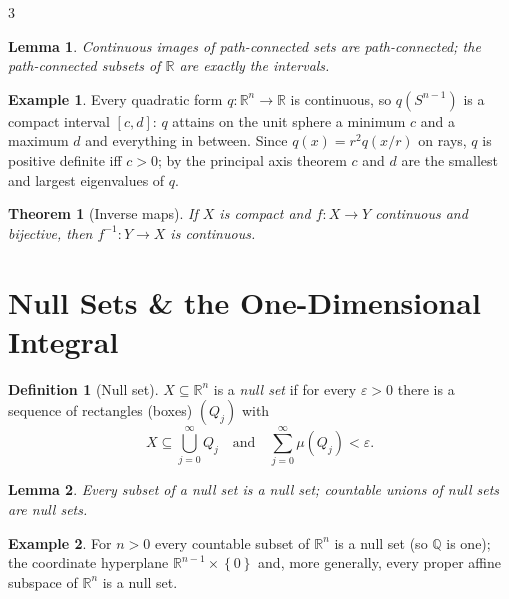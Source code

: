 \documentclass[10pt,a4paper,landscape]{article}
\theoremstyle{definition}
\newtheorem{defn}{Definition}[section]
\newtheorem{exm}{Example}[section]
\theoremstyle{plain}
\newtheorem{thm}{Theorem}[section]
\newtheorem{lem}{Lemma}[section]
\theoremstyle{remark}
\newcommand{\R}{\mathbb{R}}
\newcommand{\Q}{\mathbb{Q}}
\newcommand{\eps}{\varepsilon}
\newcommand{\set}[1]{\left\{ #1 \right\}}
\newcommand{\oo}{\infty}
\begin{document}
\begin{multicols*}{3}
\begin{lem}
Continuous images of path-connected sets are path-connected; the path-connected subsets of $\R$ are exactly the intervals.
\end{lem}

\begin{exm}
Every quadratic form $q: \R^n \to \R$ is continuous, so $q(S^{n-1})$ is a compact interval $[c,d]$: $q$ attains on the unit sphere a minimum $c$ and a maximum $d$ and everything in between. Since $q(x) = r^2 q(x/r)$ on rays, $q$ is positive definite iff $c > 0$; by the principal axis theorem $c$ and $d$ are the smallest and largest eigenvalues of $q$.
\end{exm}

\begin{thm}[Inverse maps]
If $X$ is compact and $f: X \to Y$ continuous and bijective, then $f^{-1}: Y \to X$ is continuous.
\end{thm}

\section{Null Sets \& the One-Dimensional Integral}

\begin{defn}[Null set]
$X \subseteq \R^n$ is a \emph{null set} if for every $\eps > 0$ there is a sequence of rectangles (boxes) $(Q_j)$ with
\[
X \subseteq \textstyle\bigcup_{j=0}^{\oo} Q_j \quad \text{and} \quad \sum_{j=0}^{\oo} \mu(Q_j) < \eps .
\]
\end{defn}

\begin{lem}
Every subset of a null set is a null set; countable unions of null sets are null sets.
\end{lem}

\begin{exm}
For $n > 0$ every countable subset of $\R^n$ is a null set (so $\Q$ is one); the coordinate hyperplane $\R^{n-1} \times \set{0}$ and, more generally, every proper affine subspace of $\R^n$ is a null set.
\end{exm}


\end{multicols*}
\end{document}
